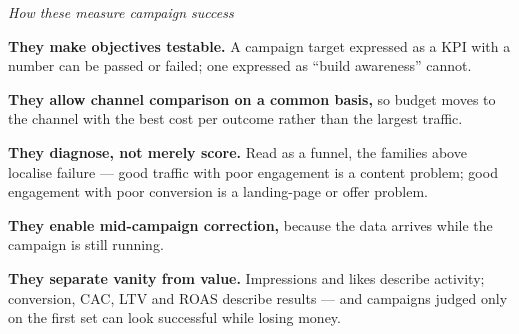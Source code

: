 \begin{qlist}
\textit{How these measure campaign success}
\begin{apts}\setcounter{enumi}{5}
\item \textbf{They make objectives testable.} A campaign target expressed as a
      KPI with a number can be passed or failed; one expressed as ``build
      awareness'' cannot.
\item \textbf{They allow channel comparison on a common basis,} so budget moves
      to the channel with the best cost per outcome rather than the largest
      traffic.
\item \textbf{They diagnose, not merely score.} Read as a funnel, the families
      above localise failure --- good traffic with poor engagement is a content
      problem; good engagement with poor conversion is a landing-page or offer
      problem.
\item \textbf{They enable mid-campaign correction,} because the data arrives
      while the campaign is still running.
\item \textbf{They separate vanity from value.} Impressions and likes describe
      activity; conversion, CAC, LTV and ROAS describe results --- and campaigns
      judged only on the first set can look successful while losing money.
\end{apts}


\end{qlist}
